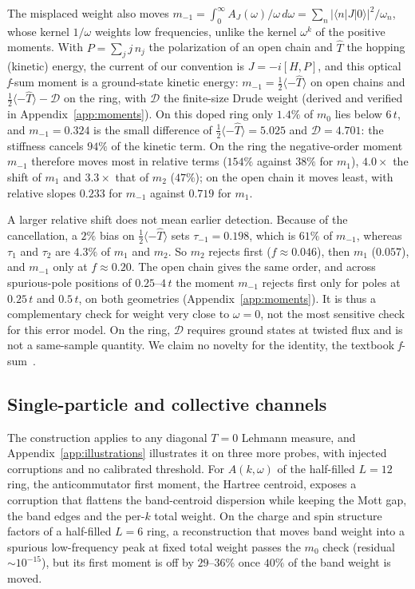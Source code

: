 \documentclass[submission, PhysCore]{SciPost}
\begin{document}
The misplaced weight also moves $m_{-1}=\int_0^\infty A_J(\omega)/\omega\,d\omega=\sum_n|\langle n|J|0\rangle|^2/\omega_n$, whose kernel $1/\omega$ weights low frequencies, unlike the kernel $\omega^k$ of the positive moments. With $P=\sum_j j\,n_j$ the polarization of an open chain and $\hat T$ the hopping (kinetic) energy, the current of our convention is $J=-i[H,P]$, and this optical \textit{f}-sum moment is a ground-state kinetic energy: $m_{-1}=\tfrac12\langle-\hat T\rangle$ on open chains and $\tfrac12\langle-\hat T\rangle-\mathcal D$ on the ring, with $\mathcal D$ the finite-size Drude weight (derived and verified in Appendix~\ref{app:moments}). On this doped ring only $1.4\%$ of $m_0$ lies below $6\,t$, and $m_{-1}=0.324$ is the small difference of $\tfrac12\langle-\hat T\rangle=5.025$ and $\mathcal D=4.701$: the stiffness cancels $94\%$ of the kinetic term. On the ring the negative-order moment $m_{-1}$ therefore moves most in relative terms ($154\%$ against $38\%$ for $m_1$), $4.0\times$ the shift of $m_1$ and $3.3\times$ that of $m_2$ ($47\%$); on the open chain it moves least, with relative slopes $0.233$ for $m_{-1}$ against $0.719$ for $m_1$.

A larger relative shift does not mean earlier detection. Because of the cancellation, a $2\%$ bias on $\tfrac12\langle-\hat T\rangle$ sets $\tau_{-1}=0.198$, which is $61\%$ of $m_{-1}$, whereas $\tau_1$ and $\tau_2$ are $4.3\%$ of $m_1$ and $m_2$. So $m_2$ rejects first ($f\approx0.046$), then $m_1$ ($0.057$), and $m_{-1}$ only at $f\approx0.20$. The open chain gives the same order, and across spurious-pole positions of $0.25$--$4\,t$ the moment $m_{-1}$ rejects first only for poles at $0.25\,t$ and $0.5\,t$, on both geometries (Appendix~\ref{app:moments}). It is thus a complementary check for weight very close to $\omega=0$, not the most sensitive check for this error model. On the ring, $\mathcal D$ requires ground states at twisted flux and is not a same-sample quantity. We claim no novelty for the identity, the textbook \textit{f}-sum~\cite{Kohn1964,Maldague1977}.

\subsection{Single-particle and collective channels}
The construction applies to any diagonal $T=0$ Lehmann measure, and Appendix~\ref{app:illustrations} illustrates it on three more probes, with injected corruptions and no calibrated threshold. For $A(k,\omega)$ of the half-filled $L=12$ ring, the anticommutator first moment, the Hartree centroid, exposes a corruption that flattens the band-centroid dispersion while keeping the Mott gap, the band edges and the per-$k$ total weight. On the charge and spin structure factors of a half-filled $L=6$ ring, a reconstruction that moves band weight into a spurious low-frequency peak at fixed total weight passes the $m_0$ check (residual $\sim\!10^{-15}$), but its first moment is off by $29$--$36\%$ once $40\%$ of the band weight is moved.
\end{document}
